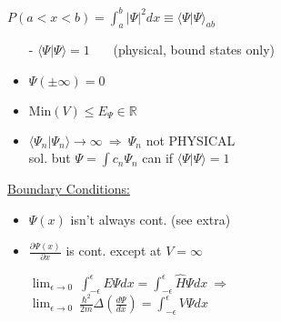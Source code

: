 \documentclass[12pt]{article}
\begin{document}
\hfill \break
\begin{minipage}[t]{0.5\textwidth}
    \underline{\( P{\scriptstyle(a<x<b)} = \int_{a}^{b} | \Psi |^2 dx 
        \equiv \langle \Psi | \Psi \rangle_{ab} \)}
    \begin{itemize}
        \item[-] \( \boxed{ \langle \Psi | \Psi \rangle = 1 } \) \ \ \ {\scriptsize(physical, bound states only)}
        \item \( \Psi(\pm \infty) = 0 \)
        \item \( \text{Min}(V) \leq E_\Psi \in \mathbb{R} \) 
        \item \( \langle \Psi_n | \Psi_n \rangle \rightarrow \infty \ \Rightarrow \
            \Psi_n \) not PHYSICAL\\[5pt]
            sol. but \( \Psi = \int c_n \Psi_n \) can if 
            \( \langle \Psi|\Psi \rangle = 1 \)
    \end{itemize}
\end{minipage} 
\begin{minipage}[t]{0.5\textwidth}
    \underline{Boundary Conditions:}
    \begin{itemize}
        \item \( \Psi(x) \) isn't always cont. (see extra)
        \item \( \frac{\partial \Psi(x)}{\partial x} \) is cont. except at \( V = \infty \) 
        \item[] \begin{itemize}
                \( \lim_{\epsilon \rightarrow 0} \ \int_{-\epsilon}^{\epsilon}  E \Psi dx 
                    = \int_{-\epsilon}^{\epsilon} \widehat{H} \Psi dx \ \Rightarrow\) \\[5pt]
                \( \lim_{\epsilon \rightarrow 0} \ \frac{\hbar^2}{2m} \Delta ( \frac{d \Psi}{dx} )
                    = \int_{-\epsilon}^{\epsilon} V \Psi dx \)
            \end{itemize}
    \end{itemize}
\end{minipage}
\end{document}
